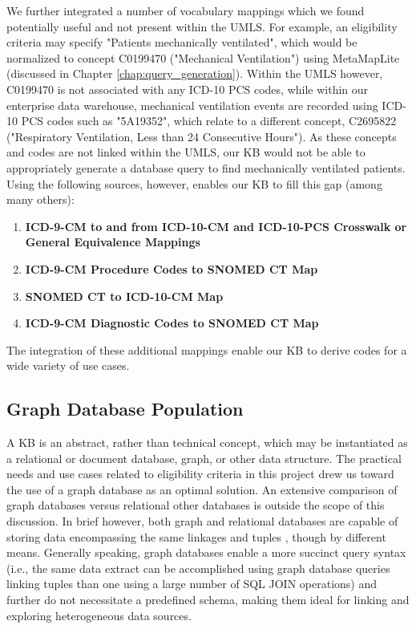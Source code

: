 \documentclass[../main.tex]{subfiles}
\begin{document}
We further integrated a number of vocabulary mappings which we found potentially useful and not present within the UMLS. For example, an eligibility criteria may specify "Patients mechanically ventilated", which would be normalized to concept C0199470 ("Mechanical Ventilation") using MetaMapLite (discussed in Chapter \ref{chap:query_generation}). Within the UMLS however, C0199470 is not associated with any ICD-10 PCS codes, while within our enterprise data warehouse, mechanical ventilation events are recorded using ICD-10 PCS codes such as "5A19352", which relate to a different concept, C2695822 ("Respiratory Ventilation, Less than 24 Consecutive Hours"). As these concepts and codes are not linked within the UMLS, our KB would not be able to appropriately generate a database query to find mechanically ventilated patients. Using the following sources, however, enables our KB to fill this gap (among many others):

\begin{enumerate}
    \item \textbf{ICD-9-CM to and from ICD-10-CM and ICD-10-PCS Crosswalk or General Equivalence Mappings} \cite{icd9_icd10_icd10pcs}
    \item \textbf{ICD-9-CM Procedure Codes to SNOMED CT Map} \cite{icd9proc_snomed}
    \item \textbf{SNOMED CT to ICD-10-CM Map} \cite{snomed_icd10}
    \item \textbf{ICD-9-CM Diagnostic Codes to SNOMED CT Map} \cite{icd9dx_snomed}
\end{enumerate}

The integration of these additional mappings enable our KB to derive codes for a wide variety of use cases.

\subsection{Graph Database Population}

A KB is an abstract, rather than technical concept, which may be instantiated as a relational or document database, graph, or other data structure. The practical needs and use cases related to eligibility criteria in this project drew us toward the use of a graph database as an optimal solution. An extensive comparison of graph databases versus relational other databases is outside the scope of this discussion. In brief however, both graph and relational databases are capable of storing data encompassing the same linkages and tuples \cite{priyatna2014formalisation}, though by different means. Generally speaking, graph databases enable a more succinct query syntax (i.e., the same data extract can be accomplished using graph database queries linking tuples than one using a large number of SQL JOIN operations) and further do not necessitate a predefined schema, making them ideal for linking and exploring heterogeneous data sources.
\end{document}

